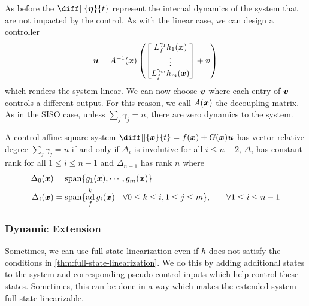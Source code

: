 As before the $\diff[]{\bs{\eta}}{t}$ represent the internal dynamics of the
system that are not impacted by the control. As with the linear case, we can
design a controller \[
	\boldsymbol{u} = A^{-1}(\boldsymbol{x})\left(
	\begin{bmatrix}
		L_f^{\gamma_1}h_1(\boldsymbol{x})\\
		\vdots\\
		L_f^{\gamma_m}h_m(\boldsymbol{x})\\
	\end{bmatrix} + \boldsymbol{v}\right)
\]
which renders the system linear. We can now choose $\boldsymbol{v}$ where each entry of
$\boldsymbol{v}$ controls a different output. For this reason, we call $A(\boldsymbol{x})$ the
decoupling matrix. As in the SISO case, unless $\sum_j \gamma_j = n$, there are
zero dynamics to the system.
\begin{theorem}
	A control affine square system $\diff[]{\bs{x}}{t} = f(\bs{x}) +
	G(\bs{x})\bs{u}$ has vector relative degree $\sum_j \gamma_j = n$ if and only
	if $\Delta_i$ is involutive for all $i \leq n-2$, $\Delta_i$ has constant rank
	for all $1 \leq i \leq n-1$ and $\Delta_{n-1}$ has rank $n$ where \[
		\begin{aligned}
			\Delta_0(\bs{x}) &= \text{span}\{g_1(\bs{x}),\cdots,g_m(\bs{x})\}\\
			\Delta_i(\bs{x}) &= \text{span}\{\ad_f^kg_i(\bs{x})\ |\  \forall 0 \leq k \leq i,
			1 \leq j \leq m\}, &\quad \forall 1 \leq i \leq n-1
		\end{aligned}
	\]
	\label{thm:full-state-linearization-mimo}
\end{theorem}
\subsubsection{Dynamic Extension}
Sometimes, we can use full-state linearization even if $h$ does not satisfy the
conditions in \cref{thm:full-state-linearization}. We do this by adding
additional states to the system and corresponding pseudo-control inputs which
help control these states. Sometimes, this can be done in a way which makes the
extended system full-state linearizable.
